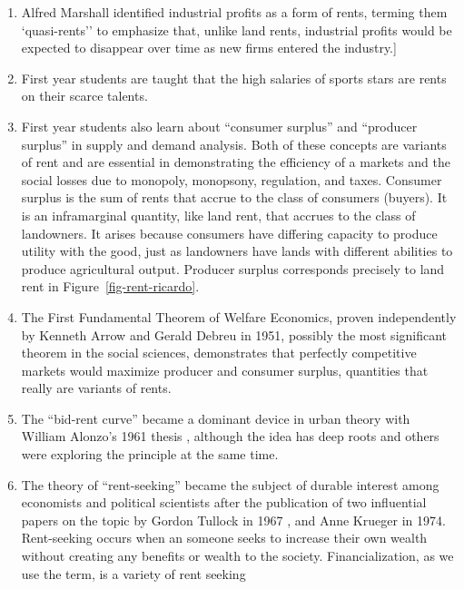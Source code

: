 \begin{enumerate}
    \item Alfred Marshall identified industrial profits as a form of rents, terming them `quasi-rents'' to emphasize that, unlike land rents, industrial profits would  be expected to disappear over time as new firms entered the industry.]
    \item First year students are taught that the high salaries of  sports stars are rents on their scarce talents. 
    \item First year students also learn about ``consumer surplus'' and ``producer surplus'' in supply and demand analysis. Both of these concepts are variants of rent and are essential in demonstrating the efficiency of a markets and the social losses due to monopoly, monopsony, regulation, and taxes. Consumer surplus is the sum of rents that accrue to the class of consumers (buyers). It is an inframarginal quantity, like land  rent, that accrues to the class of landowners. It arises because consumers have differing capacity to produce  utility with the good, just as landowners have lands with different abilities to produce agricultural output. Producer surplus corresponds precisely to land rent in Figure~\ref{fig-rent-ricardo}.  
    \item The First Fundamental Theorem of Welfare Economics, proven independently by Kenneth Arrow \cite{arrowExtensionBasicTheorems1951}and  Gerald Debreu \cite{debreuCoefficientResourceUtilization1951}  in 1951, possibly the most significant theorem in the social sciences,   demonstrates that perfectly competitive markets would maximize producer and consumer surplus, quantities that really are variants of rents.
    \item The ``\gls{bid-rent curve}'' became a dominant device  in urban theory with William Alonzo's 1961 thesis \cite{alonzoTheoryUrbanLand1960}, although the idea has deep roots and others were exploring the principle at the same time.  
    \item The theory of ``\gls{rent-seeking}''   became the subject of durable interest among economists and political scientists after the publication of two influential papers on the topic by Gordon Tullock in 1967 \cite{tullockWelfareCostsTariffs1967}, and Anne Krueger \cite{kruegerPoliticalEconomyRentSeeking1974} in 1974. Rent-seeking occurs when an someone seeks to increase their own wealth without creating any benefits or wealth to the society. Financialization, as we use the term, is a variety of rent seeking
\end{enumerate}

